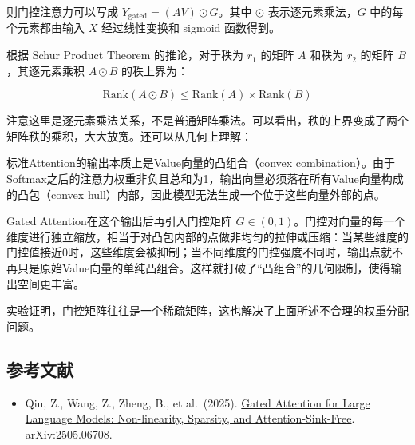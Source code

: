 则门控注意力可以写成 \(Y_{\mathrm{gated}}=(AV)\odot G\)。其中 \(\odot\) 表示逐元素乘法，\(G\) 中的每个元素都由输入 \(X\) 经过线性变换和 sigmoid 函数得到。

根据 Schur Product Theorem 的推论，对于秩为 \(r_1\) 的矩阵 \(A\) 和秩为 \(r_2\) 的矩阵 \(B\)，其逐元素乘积 \(A\odot B\) 的秩上界为：

\[
\mathrm{Rank}(A\odot B)\le \mathrm{Rank}(A)\times \mathrm{Rank}(B)
\]

注意这里是逐元素乘法关系，不是普通矩阵乘法。可以看出，秩的上界变成了两个矩阵秩的乘积，大大放宽。还可以从几何上理解：

标准Attention的输出本质上是Value向量的凸组合（convex combination）。由于Softmax之后的注意力权重非负且总和为1，输出向量必须落在所有Value向量构成的凸包（convex hull）内部，因此模型无法生成一个位于这些向量外部的点。

Gated Attention在这个输出后再引入门控矩阵 \(G\in(0,1)\)。门控对向量的每一个维度进行独立缩放，相当于对凸包内部的点做非均匀的拉伸或压缩：当某些维度的门控值接近0时，这些维度会被抑制；当不同维度的门控强度不同时，输出点就不再只是原始Value向量的单纯凸组合。这样就打破了``凸组合''的几何限制，使得输出空间更丰富。

实验证明，门控矩阵往往是一个稀疏矩阵，这也解决了上面所述不合理的权重分配问题。

\hypertarget{ux53c2ux8003ux6587ux732e-100}{%
\subsection{参考文献}\label{ux53c2ux8003ux6587ux732e-100}}

\vspace{0.25em}
\begin{itemize}
\tightlist
\item
  Qiu, Z., Wang, Z., Zheng, B., et al.~(2025). \href{https://arxiv.org/abs/2505.06708}{Gated Attention for Large Language Models: Non-linearity, Sparsity, and Attention-Sink-Free}. arXiv:2505.06708.
\end{itemize}

\clearpage
